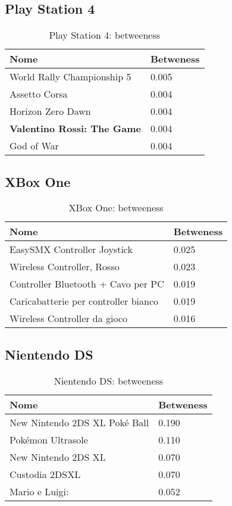 		\subsection{Play Station 4}
			\begin{table}[H]
				\caption{Play Station 4: betweeness}
				\label{tab:ps4}
				\centering
				\begin{tabular}{ll}
					\toprule
					\textbf{Nome} & \textbf{Betweness} \\
					\midrule
					World Rally Championship 5  & 0.005 \\
					Assetto Corsa  & 0.004 \\
					Horizon Zero Dawn  & 0.004 \\
					\textbf{Valentino Rossi: The Game}  & 0.004 \\
					God of War  & 0.004 \\		
					\bottomrule
				\end{tabular}
			\end{table}
		
		
		\subsection{XBox One}
			\begin{table}[H]
				\caption{XBox One: betweeness}
				\label{tab:xbox}
				\centering
				\begin{tabular}{ll}
					\toprule 
					\textbf{Nome} & \textbf{Betweness} \\
					\midrule
					EasySMX Controller Joystick  & 0.025 \\
					Wireless Controller, Rosso  & 0.023 \\
					Controller Bluetooth + Cavo per PC  & 0.019 \\
					Caricabatterie per controller bianco & 0.019 \\
					Wireless Controller da gioco & 0.016 \\		
					\bottomrule
				\end{tabular}
			\end{table}
			
		\subsection{Nientendo DS}
			\begin{table}[H]
				\caption{Nientendo DS: betweeness}
				\label{tab:nientendoDS}
				\centering
				\begin{tabular}{ll}
					\toprule 
					\textbf{Nome} & \textbf{Betweness} \\
					\midrule
					New Nintendo 2DS XL Poké Ball  & 0.190 \\
					Pokémon Ultrasole  & 0.110 \\
					New Nintendo 2DS XL  & 0.070 \\
					Custodia 2DSXL & 0.070 \\
					Mario e Luigi: & 0.052 \\		
					\bottomrule
				\end{tabular}
			\end{table}
		
